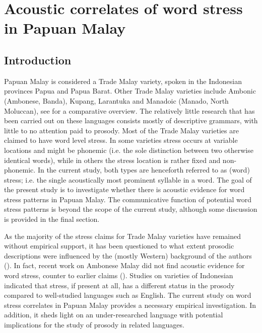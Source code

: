 \chapter{Acoustic correlates of word stress in Papuan Malay} \label{chAc}

\section{Introduction}
Papuan Malay is considered a Trade Malay variety, spoken in the Indonesian provinces Papua and Papua Barat. Other Trade Malay varieties include Ambonic (Ambonese, Banda), Kupang, Larantuka and Manadoic (Manado, North Moluccan), see \citet{paauw_malay_2009} for a comparative overview. The relatively little research that has been carried out on these languages consists mostly of descriptive grammars, with little to no attention paid to prosody. Most of the Trade Malay varieties are claimed to have word level stress. In some varieties stress occurs at variable locations and might be phonemic (i.e. the sole distinction between two otherwise identical words), while in others the stress location is rather fixed and non-phonemic. In the current study, both types are henceforth referred to as (word) stress; i.e. the single acoustically most prominent syllable in a word. The goal of the present study is to investigate whether there is acoustic evidence for word stress patterns in Papuan Malay. The communicative function of potential word stress patterns is beyond the scope of the current study, although some discussion is provided in the final section.\par

As the majority of the stress claims for Trade Malay varieties have remained without empirical support, it has been questioned to what extent prosodic descriptions were influenced by the (mostly Western) background of the authors (\citealt{himmelmann_preliminary_2018}). In fact, recent work on Ambonese Malay did not find acoustic evidence for word stress, counter to earlier claims (\citealt{maskikit-essed_no_2016}). Studies on varieties of Indonesian indicated that stress, if present at all, has a different status in the prosody compared to well-studied languages such as English. The current study on word stress correlates in Papuan Malay provides a necessary empirical investigation. In addition, it sheds light on an under-researched language with potential implications for the study of prosody in related languages. \par

